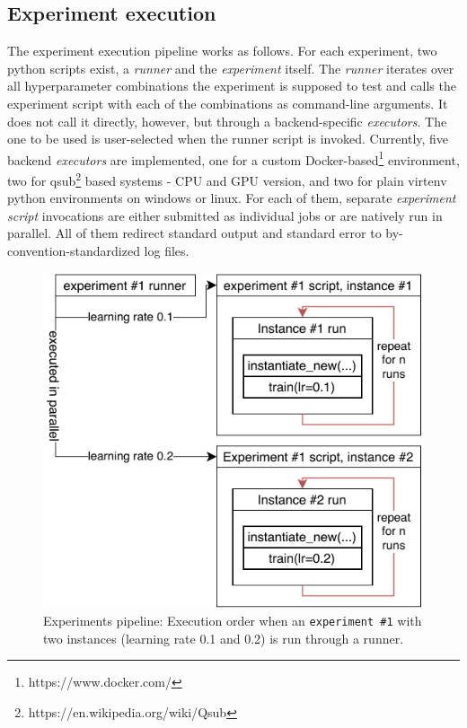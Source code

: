 \subsection{Experiment execution}
The experiment execution pipeline works as follows. For each experiment, two python scripts exist, a \textit{runner} and the \textit{experiment} itself. The \textit{runner} iterates over all hyperparameter combinations the experiment is supposed to test and calls the experiment script with each of the combinations as command-line arguments. It does not call it directly, however, but through a backend-specific \textit{executors}. The one to be used is user-selected when the runner script is invoked. Currently, five backend \textit{executors} are implemented, one for a custom Docker-based\footnote{https://www.docker.com/} environment, two for qsub\footnote{https://en.wikipedia.org/wiki/Qsub} based systems - CPU and GPU version, and two for plain virtenv python environments on windows or linux. For each of them, separate \textit{experiment script} invocations are either submitted as individual jobs or are natively run in parallel. All of them redirect standard output and standard error to by-convention-standardized log files.

\begin{figure}[ht]
    \centering
    \includegraphics[]{../figures/03_msc-neuro_1}
    \caption[Experiments pipeline]{Experiments pipeline: Execution order when an \texttt{experiment \#1} with two instances (learning rate 0.1 and 0.2) is run through a runner.}
    \label{fig:3.3}
\end{figure}

